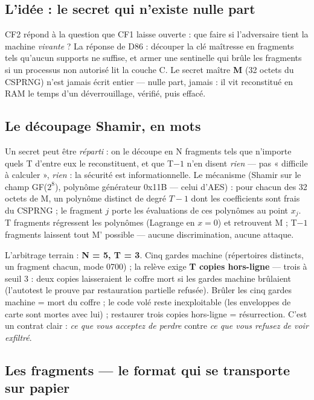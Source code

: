 \subsection{L'idée : le secret qui n'existe nulle part}

CF2 répond à la question que CF1 laisse ouverte : que faire si l'adversaire tient la
machine \emph{vivante} ? La réponse de D86 : découper la clé maîtresse en fragments
tels qu'aucun supports ne suffise, et armer une sentinelle qui brûle les fragments si
un processus non autorisé lit la couche C. Le secret maître \textbf{M} (32 octets du
CSPRNG) n'est jamais écrit entier — nulle part, jamais : il vit reconstitué en RAM le
temps d'un déverrouillage, vérifié, puis effacé.

\subsection{Le découpage Shamir, en mots}

Un secret peut être \emph{réparti} : on le découpe en N fragments tels que n'importe
quels T d'entre eux le reconstituent, et que T$-1$ n'en disent \emph{rien} — pas
« difficile à calculer », \emph{rien} : la sécurité est informationnelle. Le mécanisme
(Shamir sur le champ GF($2^8$), polynôme générateur 0x11B — celui d'AES) : pour chacun
des 32 octets de M, un polynôme distinct de degré $T-1$ dont les coefficients sont
frais du CSPRNG ; le fragment $j$ porte les évaluations de ces polynômes au point
$x_j$. T fragments régressent les polynômes (Lagrange en $x=0$) et retrouvent M ;
T$-1$ fragments laissent tout M' possible — aucune discrimination, aucune attaque.

L'arbitrage terrain : \textbf{N = 5, T = 3}. Cinq gardes machine (répertoires distincts,
un fragment chacun, mode 0700) ; la relève exige \textbf{T copies hors-ligne} — trois
à seuil 3 : deux copies laisseraient le coffre mort si les gardes machine brûlaient
(l'autotest le prouve par restauration partielle refusée). Brûler les cinq gardes
machine = mort du coffre ; le code volé reste inexploitable (les enveloppes de carte
sont mortes avec lui) ; restaurer trois copies hors-ligne = résurrection. C'est un
contrat clair : \emph{ce que vous acceptez de perdre} contre \emph{ce que vous refusez
de voir exfiltré}.

\subsection{Les fragments — le format qui se transporte sur papier}

